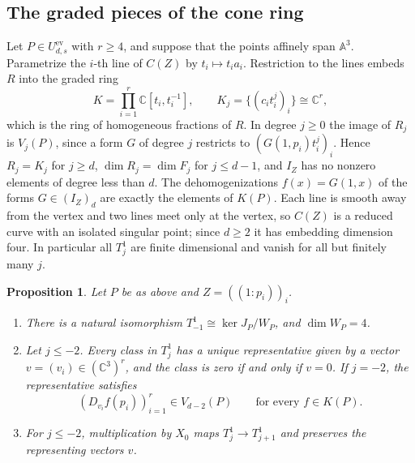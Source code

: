 \documentclass{amsart}
\newtheorem{proposition}[theorem]{Proposition}
\theoremstyle{definition}
\theoremstyle{remark}
\numberwithin{equation}{section}
\newcommand{\CC}{\mathbb{C}}
\newcommand{\A}{\mathbb{A}}
\begin{document}
\subsection{The graded pieces of the cone ring}
Let $P\in U^{\mathrm{ev}}_{d,s}$ with $r\ge4$, and suppose that
the points affinely span $\A^3$. Parametrize the $i$-th line of $C(Z)$ by
$t_i\mapsto t_ia_i$. Restriction to the lines embeds $R$ into the graded ring
\[
  K=\prod_{i=1}^r\CC[t_i,t_i^{-1}],\qquad K_j=\{(c_it_i^j)_i\}\cong\CC^r,
\]
which is the ring of homogeneous fractions of $R$. In degree $j\ge0$ the image of
$R_j$ is $V_j(P)$, since a form $G$ of degree $j$ restricts to
$(G(1,p_i)t_i^j)_i$. Hence $R_j=K_j$ for $j\ge d$, $\dim R_j=\dim F_j$ for
$j\le d-1$, and $I_Z$ has no nonzero elements of degree less than $d$. The
dehomogenizations $f(x)=G(1,x)$ of the forms $G\in(I_Z)_d$ are exactly the elements
of $K(P)$. Each line is smooth away from the vertex and two lines meet only at the
vertex, so $C(Z)$ is a reduced curve with an isolated singular point; since $d\ge2$
it has embedding dimension four. In particular all $T^1_j$ are finite dimensional
and vanish for all but finitely many $j$.

\begin{proposition}\label{prop:T1model}
Let $P$ be as above and $Z=((1:p_i))_i$.
\begin{enumerate}[label=\textup{(\alph*)}]
\item There is a natural isomorphism $T^1_{-1}\cong\ker J_P/W_P$, and $\dim W_P=4$.
\item Let $j\le-2$. Every class in $T^1_j$ has a unique representative given by a
vector $v=(v_i)\in(\CC^3)^r$, and the class is zero if and only if $v=0$. If
$j=-2$, the representative satisfies
\begin{equation}\label{eq:minus2}
  (D_{v_i}f(p_i))_{i=1}^r\in V_{d-2}(P)\qquad\text{for every } f\in K(P).
\end{equation}
\item For $j\le-2$, multiplication by $X_0$ maps $T^1_j\to T^1_{j+1}$ and
preserves the representing vectors $v$.
\end{enumerate}
\end{proposition}
\end{document}
